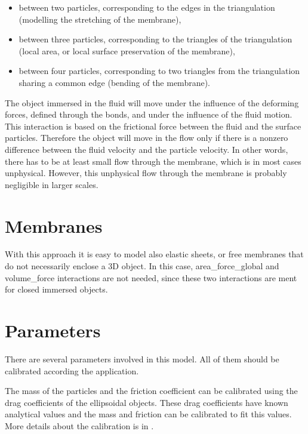 \begin{itemize}
\item between two particles, corresponding to the edges in the triangulation (modelling 
the stretching of the membrane), 
\item between three particles, corresponding to the triangles of the triangulation (local 
area, or local surface preservation of the membrane), 
\item between four particles, corresponding to two triangles from the triangulation sharing 
a common edge (bending of the membrane). 
\end{itemize}

The object immersed  in the fluid will move under the influence of the deforming forces, 
defined through the bonds, and under the influence of the fluid motion. This interaction 
is based on the frictional force between the fluid and the surface particles. Therefore 
the object will move in the flow only if there is a nonzero difference between the fluid 
velocity and the particle velocity. In other words, there has to be at least small flow
through the membrane, which is in most cases unphysical. However, this unphysical flow 
through the membrane is probably negligible in larger scales.

\section{Membranes}
With this approach it is easy to model also elastic sheets, or free membranes that do 
not necessarily enclose a 3D object. In this case, area\_{}force\_{}global and 
volume\_{}force interactions are not needed, since these two interactions are ment for 
closed immersed objects.

\section{Parameters}
There are several parameters involved in this model. All of them should be calibrated
according the application. 
The mass of the particles and the friction coefficient can be calibrated using the drag 
coefficients of the ellipsoidal objects. These drag coefficients have known analytical 
values and the mass and friction can be calibrated to fit this values. More details about 
the calibration is in \cite{cimrak11a}.

